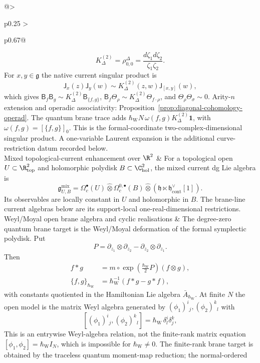 \begin{longtable}{@{}>{\raggedright\arraybackslash}p{}
  >{\raggedright\arraybackslash}p{}@{}}
\[
  K^{(2)}_\Delta=\rho^\Delta_{0,0}
  =
  \frac{d\zeta_1d\zeta_2}{\zeta_1\zeta_2}.
\]
For \(x,y\in\mathfrak g\) the native current singular product is
\[
  \mathsf{J}_x(z)\mathsf{J}_y(w)\sim
  K^{(2)}_\Delta(z,w)\mathsf{J}_{[x,y]}(w),
\]
which gives
\(\mathsf{B}_f\mathsf{B}_g\sim K^{(2)}_\Delta\mathsf{B}_{\{f,g\}}\),
\(\mathsf{B}_f\mathsf{\Theta}_\rho\sim
K^{(2)}_\Delta\mathsf{\Theta}_{f\cdot\rho}\), and
\(\mathsf{\Theta}_\rho\mathsf{\Theta}_\sigma\sim0\).
Arity-\(n\) extension and operadic associativity:
Proposition~\ref{prop:diagonal-cohomology-operad}.
The quantum brane trace adds
\(\hbar_{\mathrm{W}}N\,\omega(f,g)K^{(2)}_\Delta\mathbf1\), with
\(\omega(f,g)=[\{f,g\}]_0\).  This is the formal-coordinate
two-complex-dimensional singular product.  A one-variable Laurent expansion is the
additional curve-restriction datum recorded below.\\
\hline
Mixed topological-current enhancement over \(\R^2\) &
For a topological open \(U\subset\R^2_{\mathrm{top}}\) and holomorphic
polydisk \(B\subset\C^2_{\mathrm{hol}}\), the mixed current dg Lie algebra is
\[
  \mathfrak g^{\mathrm{mix}}_{U,B}
  =
  \Omega^\bullet_c(U)\widehat\otimes
  \Omega^{0,\bullet}_c(B)\widehat\otimes
  (\mathfrak h\ltimes\mathfrak h^\vee_{\mathrm{cont}}[1]).
\]
Its observables are locally constant in \(U\) and holomorphic in \(B\).
The brane-line current algebras below are its support-local
one-real-dimensional restrictions.\\
\hline
Weyl/Moyal open brane algebra and cyclic realisations &
The degree-zero quantum brane target is the Weyl/Moyal deformation of the
formal symplectic polydisk.  Put
\[
  P=\partial_{z_1}\otimes\partial_{z_2}
   -\partial_{z_2}\otimes\partial_{z_1}.
\]
Then
\[
  \begin{aligned}
  f*g&=m\circ\exp\!\left(\frac{\hbar_{\mathrm{W}}}{2}P\right)(f\otimes g),\\
  \{f,g\}_{\hbar_{\mathrm{W}}}&=\hbar_{\mathrm{W}}^{-1}(f*g-g*f),
  \end{aligned}
\]
 with constants quotiented in the Hamiltonian Lie algebra
\(\bar A_{\hbar_{\mathrm{W}}}\).  At finite \(N\) the open model is the matrix Weyl
algebra generated by \((\phi_1)^i{}_j,(\phi_2)^k{}_l\) with
\[
  [(\phi_1)^i{}_j,(\phi_2)^k{}_l]
  =\hbar_{\mathrm{W}}\,\delta^i_l\delta^k_j ,
\]
This is an entrywise Weyl-algebra relation, not the finite-rank matrix
equation \([\phi_1,\phi_2]=\hbar_{\mathrm{W}}I_N\), which is impossible
for \(\hbar_{\mathrm{W}}\ne0\).  The finite-rank brane target is obtained
by the traceless quantum moment-map reduction; the normal-ordered

\end{longtable}
